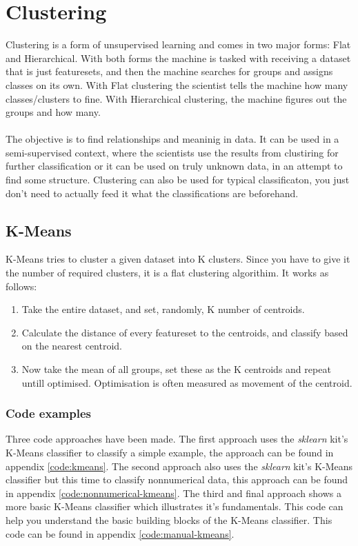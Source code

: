 \chapter{Clustering}\label{chap:clustering}

Clustering is a form of unsupervised learning and comes in two major forms: Flat and Hierarchical. With both forms the machine is tasked with receiving a dataset that is just featuresets, and then the machine searches for groups and assigns classes on its own. With Flat clustering the scientist tells the machine how many classes/clusters to fine. With Hierarchical clustering, the machine figures out the groups and how many. 
\\\\
The objective is to find relationships and meaninig in data. It can be used in a semi-supervised context, where the scientists use the results from clustiring for further classification or it can be used on truly unknown data, in an attempt to find some structure. Clustering can also be used for typical classificaton, you just don't need to actually feed it what the classifications are beforehand.

\section{K-Means}
K-Means tries to cluster a given dataset into K clusters. Since you have to give it the number of required clusters, it is a flat clustering algorithim. It works as follows:
\begin{enumerate}
\item Take the entire dataset, and set, randomly, K number of centroids.
\item Calculate the distance of every featureset to the centroids, and classify based on the nearest centroid.
\item Now take the mean of all groups, set these as the K centroids and repeat untill optimised. Optimisation is often measured as movement of the centroid.
\end{enumerate}

\subsection{Code examples}
Three code approaches have been made. The first approach uses the \emph{sklearn} kit's K-Means classifier to classify a simple example, the approach can be found in appendix \ref{code:kmeans}. The second approach also uses the \emph{sklearn} kit's K-Means classifier but this time to classify nonnumerical data, this approach can be found in appendix \ref{code:nonnumerical-kmeans}. The third and final approach shows a more basic K-Means classifier which illustrates it's fundamentals. This code can help you understand the basic building blocks of the K-Means classifier.  This code can be found in appendix \ref{code:manual-kmeans}.

